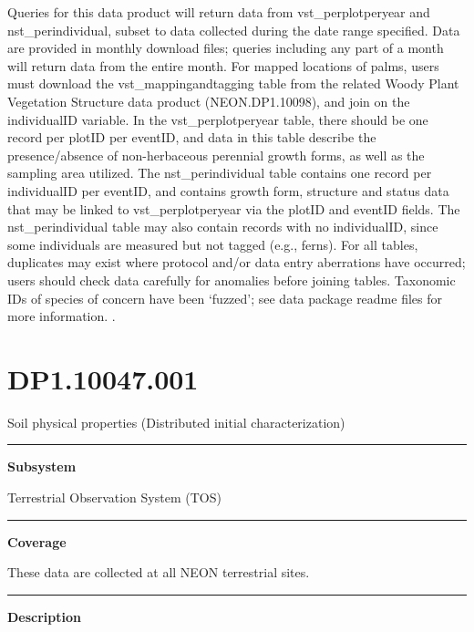 \documentclass[]{article}
\begin{document}
Queries for this data product will return data from vst\_perplotperyear
and nst\_perindividual, subset to data collected during the date range
specified. Data are provided in monthly download files; queries
including any part of a month will return data from the entire month.
For mapped locations of palms, users must download the
vst\_mappingandtagging table from the related Woody Plant Vegetation
Structure data product (NEON.DP1.10098), and join on the individualID
variable. In the vst\_perplotperyear table, there should be one record
per plotID per eventID, and data in this table describe the
presence/absence of non-herbaceous perennial growth forms, as well as
the sampling area utilized. The nst\_perindividual table contains one
record per individualID per eventID, and contains growth form, structure
and status data that may be linked to vst\_perplotperyear via the plotID
and eventID fields. The nst\_perindividual table may also contain
records with no individualID, since some individuals are measured but
not tagged (e.g., ferns). For all tables, duplicates may exist where
protocol and/or data entry aberrations have occurred; users should check
data carefully for anomalies before joining tables. Taxonomic IDs of
species of concern have been `fuzzed'; see data package readme files for
more information. \newpage
.

\section{DP1.10047.001}\label{dp1.10047.001}

Soil physical properties (Distributed initial characterization)

\begin{center}\rule{0.5\linewidth}{\linethickness}\end{center}

\textbf{Subsystem}

Terrestrial Observation System (TOS)

\begin{center}\rule{0.5\linewidth}{\linethickness}\end{center}

\textbf{Coverage}

These data are collected at all NEON terrestrial sites.

\begin{center}\rule{0.5\linewidth}{\linethickness}\end{center}

\textbf{Description}
\end{document}
